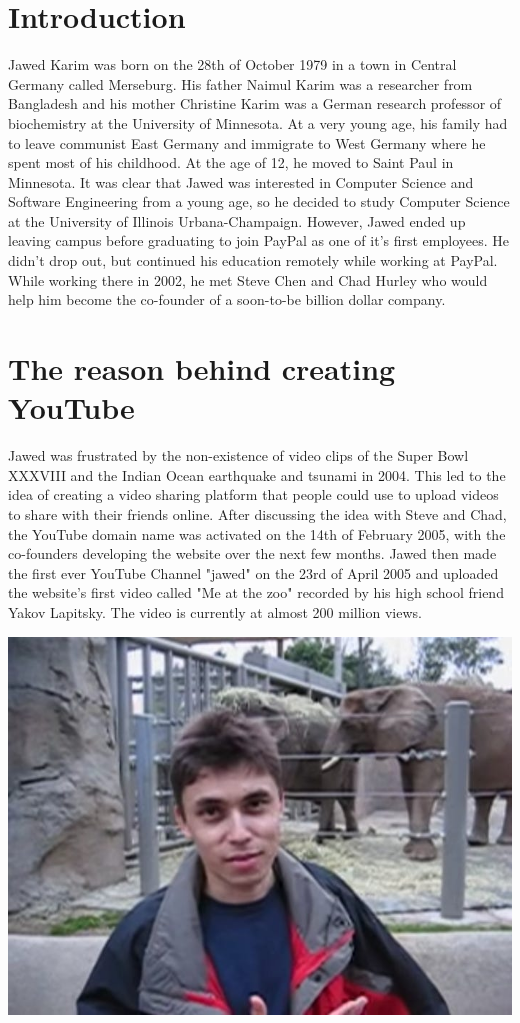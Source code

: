 \documentclass[12pt,a4paper]{article}
\begin{document}
\section{Introduction}\label{sec:intro}
Jawed Karim was born on the 28th of October 1979 in a town in Central Germany called Merseburg. His father Naimul Karim was a researcher from Bangladesh and his mother Christine Karim was a German research professor of biochemistry at the University of Minnesota. At a very young age, his family had to leave communist East Germany and immigrate to West Germany where he spent most of his childhood. At the age of 12, he moved to Saint Paul in Minnesota. It was clear that Jawed was interested in Computer Science and Software Engineering from a young age, so he decided to study Computer Science at the University of Illinois Urbana-Champaign. However, Jawed ended up leaving campus before graduating to join PayPal as one of it's first employees. He didn't drop out, but continued his education remotely while working at PayPal. While working there in 2002, he met Steve Chen and Chad Hurley who would help him become the co-founder of a soon-to-be billion dollar company.

\section{The reason behind creating YouTube}\label{sec:lit-rev}
Jawed was frustrated by the non-existence of video clips of the Super Bowl XXXVIII and the Indian Ocean earthquake and tsunami in 2004. This led to the idea of creating a video sharing platform that people could use to upload videos to share with their friends online. After discussing the idea with Steve and Chad, the YouTube domain name was activated on the 14th of February 2005, with the co-founders developing the website over the next few months. Jawed then made the first ever YouTube Channel "jawed" on the 23rd of April 2005 and uploaded the website's first video called "Me at the zoo" recorded by his high school friend Yakov Lapitsky. The video is currently at almost 200 million views.

\begin{center}
\includegraphics[scale=0.4]{images/Jawed.jpeg}
\end{center}
\end{document}
